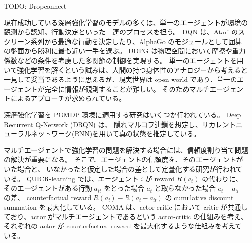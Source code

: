 TODO: Dropconnect








\iffalse
現在成功している深層強化学習のモデルの多くは、単一のエージェントが環境の観測から認知、行動決定といった一連のプロセスを担う。
DQN \citep{mnih2015human,silver2016mastering} は、Atari のスクリーン系列から最適な行動を決定したり、AlphaGo のモジュールとして囲碁の盤面から勝利に最も近い一手を選ぶ。
DDPG \citep{lillicrap2015continuous} は物理空間において摩擦や重力係数などの条件を考慮した多関節の制御を実現する。
単一のエージェントを用いて強化学習を解くという試みは、人間の持つ身体性のアナロジーから考えると一見して妥当であるように思えるが、現実世界は open world であり、単一のエージェントが完全に情報が観測することが難しい。
そのためマルチエージェントによるアプローチが求められている。

深層強化学習を POMDP 環境に適用する研究はいくつか行われている。
Deep Recurrent Q-Network (DRQN) \citep{sorokin2015deep} は、
隠れマルコフ連鎖を想定し、リカレントニューラルネットワーク(RNN)を用いて真の状態を推定している。



マルチエージェントで強化学習の問題を解決する場合には、信頼度割り当て問題の解決が重要になる。
そこで、エージェントの信頼度を、そのエージェントがいた場合と、
いなかったと仮定した場合の差として定量化する研究が行われている。
QUICR-learning \citep{agogino2006quicr} では、エージェント $i$ が reward $R(a_t)$ の代わりに、
そのエージェントがある行動 $a_{it}$ をとった場合 $a_t$ と取らなかった場合 $a_t-a_{ti}$ の差、
counterfactual reward $R(a_t) - R(a_t - a_{it})$ の cumulative discount summation を最大化している。
COMA \citep{foerster2017counterfactual} は、actor-critic において critic が共通しており、actor がマルチエージェントであるという actor-critic の仕組みを考え、それぞれの actor が counterfactual reward を最大化するような仕組みを考えている。

